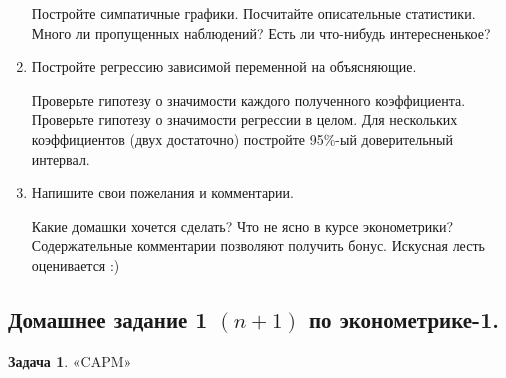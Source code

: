 \documentclass[12pt, a4paper]{article}
\theoremstyle{definition}
\begin{document}
\begin{enumerate}
Постройте симпатичные графики. Посчитайте описательные статистики. Много ли пропущенных наблюдений? Есть ли что-нибудь интересненькое?

\item Постройте регрессию зависимой переменной на объясняющие.

Проверьте гипотезу о значимости каждого полученного коэффициента. Проверьте гипотезу о значимости регрессии в целом. Для нескольких коэффициентов (двух достаточно) постройте 95\%-ый доверительный интервал.

\item Напишите свои пожелания и комментарии.

Какие домашки хочется сделать? Что не ясно в курсе эконометрики? Содержательные комментарии позволяют получить бонус. Искусная лесть оценивается :)

\end{enumerate}

\subsection{Домашнее задание 1 $(n+1)$ по эконометрике-1.}

\textbf{Задача 1}. «CAPM»
\end{document}

